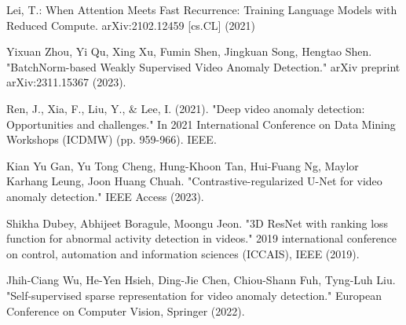 \documentclass[runningheads]{llncs}
\begin{document}
\begin{thebibliography}{99}
Lei, T.: When Attention Meets Fast Recurrence: Training Language Models with Reduced Compute. arXiv:2102.12459 [cs.CL] (2021)

Yixuan Zhou, Yi Qu, Xing Xu, Fumin Shen, Jingkuan Song, Hengtao Shen. "BatchNorm-based Weakly Supervised Video Anomaly Detection." arXiv preprint arXiv:2311.15367 (2023).

Ren, J., Xia, F., Liu, Y., \& Lee, I. (2021). "Deep video anomaly detection: Opportunities and challenges." In 2021 International Conference on Data Mining Workshops (ICDMW) (pp. 959-966). IEEE.

Kian Yu Gan, Yu Tong Cheng, Hung-Khoon Tan, Hui-Fuang Ng, Maylor Karhang Leung, Joon Huang Chuah. "Contrastive-regularized U-Net for video anomaly detection." IEEE Access (2023).

Shikha Dubey, Abhijeet Boragule, Moongu Jeon. "3D ResNet with ranking loss function for abnormal activity detection in videos." 2019 international conference on control, automation and information sciences (ICCAIS), IEEE (2019).

Jhih-Ciang Wu, He-Yen Hsieh, Ding-Jie Chen, Chiou-Shann Fuh, Tyng-Luh Liu. "Self-supervised sparse representation for video anomaly detection." European Conference on Computer Vision, Springer (2022).


\end{thebibliography}
\end{document}

